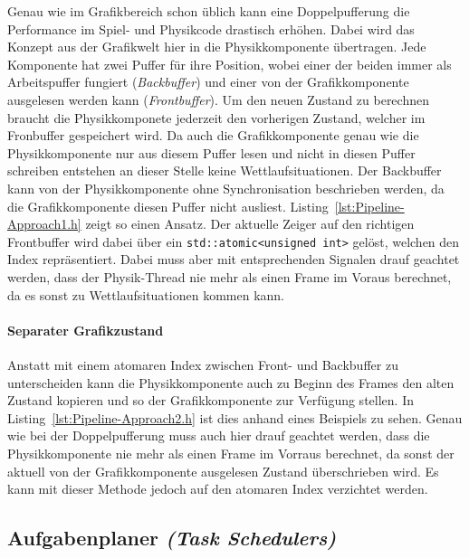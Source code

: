 \documentclass[12pt, a4paper, titlepage, hidelinks]{scrreprt}
\begin{document}
Genau wie im Grafikbereich schon üblich kann eine Doppelpufferung die Performance im Spiel- und Physikcode drastisch erhöhen. Dabei wird das Konzept aus der Grafikwelt hier in die Physikkomponente übertragen. Jede Komponente hat zwei Puffer für ihre Position, wobei einer der beiden immer als Arbeitspuffer fungiert (\textit{Backbuffer}) und einer von der Grafikkomponente ausgelesen werden kann (\textit{Frontbuffer}). Um den neuen Zustand zu berechnen braucht die Physikkomponete jederzeit den vorherigen Zustand, welcher im Fronbuffer gespeichert wird. Da auch die Grafikkomponente genau wie die Physikkomponente nur aus diesem Puffer lesen und nicht in diesen Puffer schreiben entstehen an dieser Stelle keine Wettlaufsituationen. Der Backbuffer kann von der Physikkomponente ohne Synchronisation beschrieben werden, da die Grafikkomponente diesen Puffer nicht ausliest. Listing~\autoref{lst:Pipeline-Approach1.h} zeigt so einen Ansatz. Der aktuelle Zeiger auf den richtigen Frontbuffer wird dabei über ein \texttt{std::atomic<unsigned int>} gelöst, welchen den Index repräsentiert. Dabei muss aber mit entsprechenden Signalen drauf geachtet werden, dass der Physik-Thread nie mehr als einen Frame im Voraus berechnet, da es sonst zu Wettlaufsituationen kommen kann.


\clearpage

\paragraph{Separater Grafikzustand}

Anstatt mit einem atomaren Index zwischen Front- und Backbuffer zu unterscheiden kann die Physikkomponente auch zu Beginn des Frames den alten Zustand kopieren und so der Grafikkomponente zur Verfügung stellen. In Listing~\autoref{lst:Pipeline-Approach2.h} ist dies anhand eines Beispiels zu sehen. Genau wie bei der Doppelpufferung muss auch hier drauf geachtet werden, dass die Physikkomponente nie mehr als einen Frame im Vorraus berechnet, da sonst der aktuell von der Grafikkomponente ausgelesen Zustand überschrieben wird. Es kann mit dieser Methode jedoch auf den atomaren Index verzichtet werden.


\clearpage

\subsection{Aufgabenplaner \textit{(Task Schedulers)}}
\end{document}
